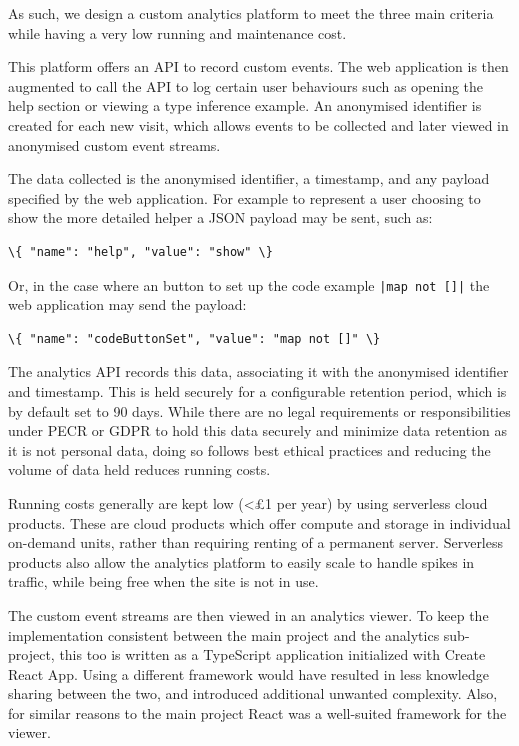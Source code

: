 \documentclass[a4paper,fleqn,twoside,12pt]{report}
\begin{document}
As such, we design a custom analytics platform to meet the three main criteria while having a very low running and maintenance cost.

This platform offers an API to record custom events. The web application is then augmented to call the API to log certain user behaviours such as opening the help section or viewing a type inference example. An anonymised identifier is created for each new visit, which allows events to be collected and later viewed in anonymised custom event streams.

The data collected is the anonymised identifier, a timestamp, and any payload specified by the web application. For example to represent a user choosing to show the more detailed helper a JSON payload may be sent, such as:

\begin{verbatim}
\{ "name": "help", "value": "show" \}
\end{verbatim}

Or, in the case where an button to set up the code example \texttt{|map not []|} the web application may send the payload: 

\begin{verbatim}
\{ "name": "codeButtonSet", "value": "map not []" \}
\end{verbatim}

The analytics API records this data, associating it with the anonymised identifier and timestamp. This is held securely for a configurable retention period, which is by default set to 90 days. While there are no legal requirements or responsibilities under PECR or GDPR to hold this data securely and minimize data retention as it is not personal data, doing so follows best ethical practices and reducing the volume of data held reduces running costs.

Running costs generally are kept low (<£1 per year) by using serverless cloud products. These are cloud products which offer compute and storage in individual on-demand units, rather than requiring renting of a permanent server. Serverless products also allow the analytics platform to easily scale to handle spikes in traffic, while being free when the site is not in use.

The custom event streams are then viewed in an analytics viewer. To keep the implementation consistent between the main project and the analytics sub-project, this too is written as a TypeScript application initialized with Create React App. Using a different framework would have resulted in less knowledge sharing between the two, and introduced additional unwanted complexity. Also, for similar reasons to the main project React was a well-suited framework for the viewer.
\end{document}
